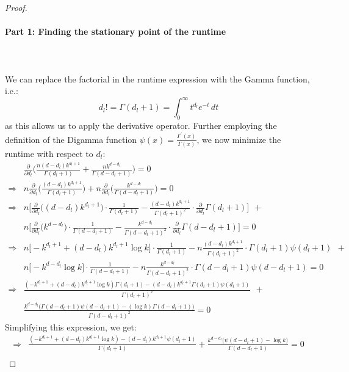 \begin{proof}
\paragraph{Part 1: Finding the stationary point of the runtime}\leavevmode\leavevmode\\\\
We can replace the factorial in the runtime expression with the Gamma function, i.e.:
\begin{equation}
    d_l! = \Gamma(d_l+1) = \int_0^\infty t^{d_l} e^{-t} \, dt
\end{equation} 
as this allows us to apply the derivative operator. Further employing the definition of the Digamma function $\psi(x) = \frac{\Gamma^\prime(x)}{\Gamma(x)}$, we now minimize the runtime with respect to $d_l$:
\begin{align}
    &\frac{\partial}{\partial d_l} \Big(\frac{n(d-d_l)k^{d_l+1}}{\Gamma(d_l+1)} + \frac{nk^{d-d_l}}{\Gamma(d-d_l+1)}\Big) = 0\\
    \Rightarrow &n \frac{\partial}{\partial d_l} \Big(\frac{(d-d_l)k^{d_l+1}}{\Gamma(d_l+1)}\Big) + n \frac{\partial}{\partial d_l} \Big(\frac{k^{d-d_l}}{\Gamma(d-d_l+1)}\Big) = 0\\
    \Rightarrow &n \Bigg[\frac{\partial}{\partial d_l} \Big((d-d_l)k^{d_l+1}\Big) \cdot \frac{1}{\Gamma(d_l+1)} - \frac{(d-d_l)k^{d_l+1}}{\Gamma(d_l+1)^2} \cdot \frac{\partial}{\partial d_l} \Gamma(d_l+1)\Bigg] \ \ + \\
    &n \Bigg[\frac{\partial}{\partial d_l} \Big(k^{d-d_l}\Big) \cdot \frac{1}{\Gamma(d-d_l+1)} - \frac{k^{d-d_l}}{\Gamma(d-d_l+1)^2} \cdot \frac{\partial}{\partial d_l} \Gamma(d-d_l+1)\Bigg] = 0\\
    \Rightarrow &n \Bigg[-k^{d_l+1} + (d-d_l)k^{d_l+1}\log k\Bigg] \cdot \frac{1}{\Gamma(d_l+1)} - n \frac{(d-d_l)k^{d_l+1}}{\Gamma(d_l+1)^2} \cdot \Gamma(d_l+1)\psi(d_l+1) \ \ + \\
    &n \Bigg[-k^{d-d_l}\log k\Bigg] \cdot \frac{1}{\Gamma(d-d_l+1)} - n \frac{k^{d-d_l}}{\Gamma(d-d_l+1)^2} \cdot \Gamma(d-d_l+1)\psi(d-d_l+1) = 0\\
    \Rightarrow &\frac{(-k^{d_l+1} + (d-d_l)k^{d_l+1}\log k)\Gamma(d_l+1) - (d-d_l)k^{d_l+1}\Gamma(d_l+1)\psi(d_l+1)}{\Gamma(d_l+1)^2} \ \ + \\
    &\frac{k^{d-d_l}\big(\Gamma(d-d_l+1)\psi(d-d_l+1) - (\log k)\Gamma(d-d_l+1)\big)}{\Gamma(d-d_l+1)^2} = 0
\end{align}
Simplifying this expression, we get:
\begin{align}
 \Rightarrow &\frac{(-k^{d_l+1}+(d-d_l)k^{d_l+1}\log k) - (d-d_l)k^{d_l+1}\psi(d_l+1)}{\Gamma(d_l+1)} + \frac{k^{d-d_l}\big(\psi(d-d_l+1)-\log k\big)}{\Gamma(d-d_l+1)} = 0\\

\end{align}
\end{proof}
